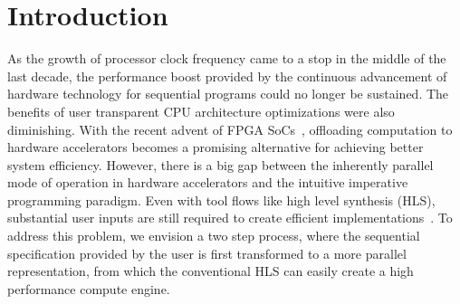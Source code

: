 \documentclass{sig-alternate}
\begin{document}



\section{Introduction}
As the growth of processor clock frequency came to a stop in the middle of the last decade, the performance boost provided by the continuous advancement of hardware technology for sequential programs could no longer be sustained. The benefits of user transparent CPU architecture optimizations were also diminishing. With the recent advent of FPGA SoCs~\cite{chips:zynq}, offloading computation to hardware accelerators becomes a promising alternative for
achieving better system efficiency. However,
there is a big gap between the inherently parallel mode of operation in hardware accelerators and the intuitive imperative programming paradigm. Even with tool flows like
high level synthesis (HLS), substantial user inputs are still required to create
efficient implementations~\cite{7082747}. To address this problem, we envision a two
step process, where the sequential specification provided by the user is first
transformed to a more parallel representation, from which the conventional HLS
can easily create a high performance compute engine.

\end{document}
